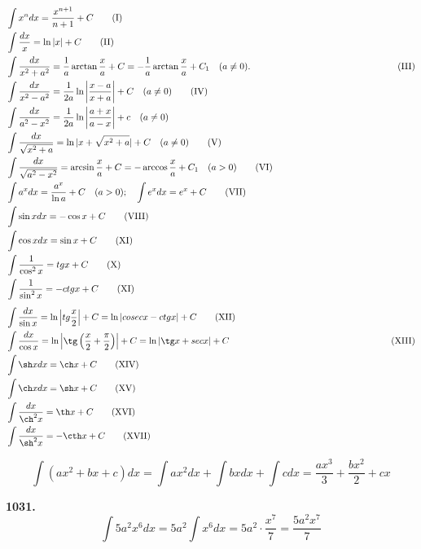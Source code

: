 \documentclass[12pt]{article}
\begin{document}
\begin{align}
	&\int x^n dx = \dfrac{x^{n+1}}{n+1} + C \label{I}\tag{I} \\
	&\int \dfrac{dx}{x} = \ln|x| +C \tag{II}\\
	&\int\dfrac{dx}{x^2+a^2} = \dfrac{1}{a}\arctan\dfrac{x}{a} +C = -\dfrac{1}{a}\arctan\dfrac{x}{a} +C_1 \quad(a\neq 0).\hspace{49mm} \tag{III}\\
	&\int \dfrac{dx}{x^2-a^2} = \dfrac{1}{2a}\ln\left|\dfrac{x-a}{x+a}\right| +C\quad (a\neq0) \tag{IV}\\
	&\int \dfrac{dx}{a^2-x^2} = \dfrac{1}{2a}\ln\left|\dfrac{a+x}{a-x}\right|+c\quad(a\neq0)\notag \\
	&\int \dfrac{dx}{\sqrt{x^2+a}} =\ln|x+\sqrt{x^2+a}|+C\quad(a\neq0)\label{V}\tag{V}\\
	&\int\dfrac{dx}{\sqrt{a^2-x^2}}= \arcsin\dfrac{x}{a} +C =-\arccos\dfrac{x}{a} +C_1 \quad(a>0)\tag{VI} \\
	&\int a^x dx = \dfrac{a^x}{\ln a} +C \quad(a>0); \quad \int e^x dx = e^x+C \tag{VII} \\
	&\int \sin x dx = -\cos x+C \tag{VIII}\\
	&\int\cos x dx = \sin x+C \tag{XI} \\
	&\int \dfrac{1}{\cos^2 x} = tg x+C\tag{X} \\
	&\int \dfrac{1}{\sin^2x} = - ctg x+C \tag{XI} 
\end{align}
\begin{align}
	&\int \dfrac{dx}{\sin x} = \ln\left|tg\dfrac{x}{2}\right|+C = \ln|cosec x - ctg x| +C\tag{XII} \\
	&\int \dfrac{dx}{\cos x} = \ln\left|\tg\left(\dfrac{x}{2}+\dfrac{\pi}{2}\right)\right|+C  = \ln|\tg x+sec x| +C\hspace{56mm} \tag{XIII} \\
	&\int \sh x dx = \ch x +C \tag{XIV} \\
	&\int \ch x dx = \sh x +C \tag{XV} \\
	&\int \dfrac{dx}{\ch^2 x} = \th x +C\tag{XVI} \\
	&\int \dfrac{dx}{\sh^2 x} = -\cth x +C \tag{XVII} 
\end{align}

	\vspace{2mm}{\tt Пример 1.}
	\[\int(ax^2+bx+c)dx = \int ax^2dx+\int bx dx +\int c dx = \dfrac{ax^3}{3}+\dfrac{bx^2}{2}+cx\]
	
	{\bf 1031.} \[\int 5a^2x^6dx = 5a^2\int x^6dx = 5a^2\cdot\dfrac{x^7}{7} = \dfrac{5a^2x^7}{7}\]
\end{document}
